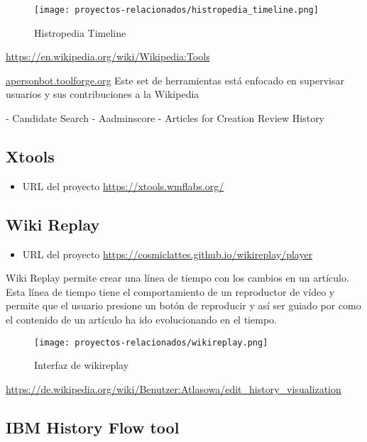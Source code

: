 \begin{figure}[H]
    \centering
    \texttt{[image: proyectos-relacionados/histropedia\_timeline.png]}
    \caption{Histropedia Timeline}
    \label{fig:histropedia_timeline}
\end{figure}


\url{https://en.wikipedia.org/wiki/Wikipedia:Tools}

\url{apersonbot.toolforge.org}
Este set de herramientas está enfocado en supervisar usuarios y sus contribuciones a la Wikipedia

- Candidate Search
- Aadminscore
- Articles for Creation Review History

\subsection{Xtools}
\begin{itemize}
    \item URL del proyecto \url{https://xtools.wmflabs.org/}
\end{itemize}

\subsection{Wiki Replay}
\begin{itemize}
    \item URL del proyecto \url{https://cosmiclattes.github.io/wikireplay/player}
\end{itemize}

Wiki Replay permite crear una línea de tiempo con los cambios en un artículo. Esta línea de tiempo
tiene el comportamiento de un reproductor de vídeo y permite que el usuario presione un botón de
reproducir y así ser guiado por como el contenido de un artículo ha ido evolucionando en el tiempo.

\begin{figure}[H]
    \centering
    \texttt{[image: proyectos-relacionados/wikireplay.png]}
    \caption{Interfaz de wikireplay}
    \label{wikireplay}
\end{figure}

\url{https://de.wikipedia.org/wiki/Benutzer:Atlasowa/edit_history_visualization}

\subsection{IBM History Flow tool}


